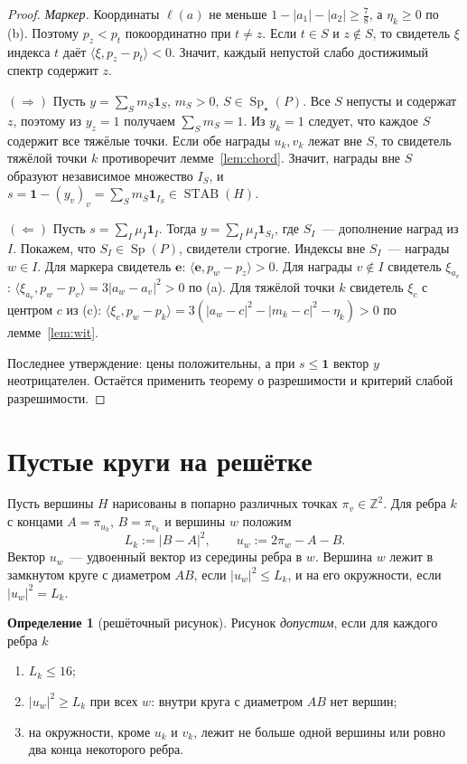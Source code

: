 \documentclass[a4paper,11pt]{article}
\theoremstyle{plain}
\theoremstyle{definition}
\newtheorem{definition}[theorem]{Определение}
\theoremstyle{remark}
\newcommand{\Z}{\mathbb{Z}}
\newcommand{\abs}[1]{\left\lvert #1 \right\rvert}
\newcommand{\ip}[2]{\langle #1, #2\rangle}
\DeclareMathOperator{\Sp}{Sp}
\DeclareMathOperator{\STAB}{STAB}
\newcommand{\Spm}{\Sp_\star}
\newcommand{\e}{\mathbf e}
\begin{document}
\begin{proof}
    \emph{Маркер.} Координаты $\ell(a)$ не меньше $1-\abs{a_1}-\abs{a_2}\ge\frac78$, а $\eta_k\ge0$ по (b). Поэтому $p_z<p_t$ покоординатно при $t\ne z$. Если $t\in S$ и $z\notin S$, то свидетель $\xi$ индекса $t$ даёт $\ip{\xi}{p_z-p_t}<0$. Значит, каждый непустой слабо достижимый спектр содержит $z$.

    $(\Rightarrow)$ Пусть $y=\sum_Sm_S\mathbf 1_S$, $m_S>0$, $S\in\Spm(P)$. Все $S$ непусты и содержат $z$, поэтому из $y_z=1$ получаем $\sum_Sm_S=1$. Из $y_k=1$ следует, что каждое $S$ содержит все тяжёлые точки. Если обе награды $u_k,v_k$ лежат вне $S$, то свидетель тяжёлой точки $k$ противоречит лемме~\ref{lem:chord}. Значит, награды вне $S$ образуют независимое множество $I_S$, и $s=\mathbf 1-(y_v)_v=\sum_Sm_S\mathbf 1_{I_S}\in\STAB(H)$.

    $(\Leftarrow)$ Пусть $s=\sum_I\mu_I\mathbf 1_I$. Тогда $y=\sum_I\mu_I\mathbf 1_{S_I}$, где $S_I$~--- дополнение наград из $I$. Покажем, что $S_I\in\Sp(P)$, свидетели строгие. Индексы вне $S_I$~--- награды $w\in I$. Для маркера свидетель $\e$: $\ip{\e}{p_w-p_z}>0$. Для награды $v\notin I$ свидетель $\xi_{a_v}$: $\ip{\xi_{a_v}}{p_w-p_v}=3\abs{a_w-a_v}^2>0$ по (a). Для тяжёлой точки $k$ свидетель $\xi_c$ с центром $c$ из (c): $\ip{\xi_c}{p_w-p_k}=3(\abs{a_w-c}^2-\abs{m_k-c}^2-\eta_k)>0$ по лемме~\ref{lem:wit}.

    Последнее утверждение: цены положительны, а при $s\le\mathbf 1$ вектор $y$ неотрицателен. Остаётся применить теорему о разрешимости и критерий слабой разрешимости.
\end{proof}

\section{Пустые круги на решётке}\label{sec:disks}

Пусть вершины $H$ нарисованы в попарно различных точках $\pi_v\in\Z^2$. Для ребра $k$ с концами $A=\pi_{u_k}$, $B=\pi_{v_k}$ и вершины $w$ положим
\[
    L_k:=\abs{B-A}^2,\qquad u_w:=2\pi_w-A-B.
\]
Вектор $u_w$~--- удвоенный вектор из середины ребра в $w$. Вершина $w$ лежит в замкнутом круге с диаметром $AB$, если $\abs{u_w}^2\le L_k$, и на его окружности, если $\abs{u_w}^2=L_k$.

\begin{definition}[решёточный рисунок]\label{def:drawing}
    Рисунок \emph{допустим}, если для каждого ребра $k$
    \begin{enumerate}[label=(\alph*)]
        \item $L_k\le16$;
        \item $\abs{u_w}^2\ge L_k$ при всех $w$: внутри круга с диаметром $AB$ нет вершин;
        \item на окружности, кроме $u_k$ и $v_k$, лежит не больше одной вершины или ровно два конца некоторого ребра.
    \end{enumerate}
\end{definition}
\end{document}
